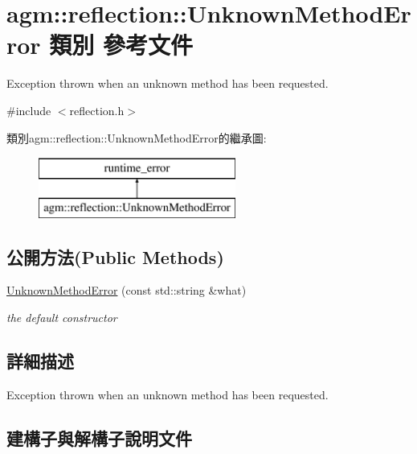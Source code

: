 \hypertarget{classagm_1_1reflection_1_1_unknown_method_error}{}\section{agm\+:\+:reflection\+:\+:Unknown\+Method\+Error 類別 參考文件}
\label{classagm_1_1reflection_1_1_unknown_method_error}


Exception thrown when an unknown method has been requested.  




{\ttfamily \#include $<$reflection.\+h$>$}

類別agm\+:\+:reflection\+:\+:Unknown\+Method\+Error的繼承圖\+:\begin{figure}[H]
\begin{center}
\leavevmode
\includegraphics[height=2.000000cm]{classagm_1_1reflection_1_1_unknown_method_error}
\end{center}
\end{figure}
\subsection*{公開方法(Public Methods)}
\begin{DoxyCompactItemize}
\item 
\hyperlink{classagm_1_1reflection_1_1_unknown_method_error_a81dd456569fff8600febb4139a0a7395}{Unknown\+Method\+Error} (const std\+::string \&what)
\begin{DoxyCompactList}\small\item\em the default constructor \end{DoxyCompactList}\end{DoxyCompactItemize}


\subsection{詳細描述}
Exception thrown when an unknown method has been requested. 

\subsection{建構子與解構子說明文件}
